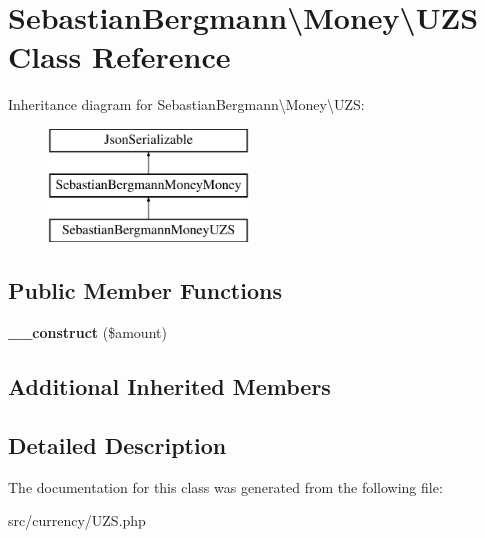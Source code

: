 \hypertarget{classSebastianBergmann_1_1Money_1_1UZS}{}\section{Sebastian\+Bergmann\textbackslash{}Money\textbackslash{}U\+Z\+S Class Reference}
\label{classSebastianBergmann_1_1Money_1_1UZS}
Inheritance diagram for Sebastian\+Bergmann\textbackslash{}Money\textbackslash{}U\+Z\+S\+:\begin{figure}[H]
\begin{center}
\leavevmode
\includegraphics[height=3.000000cm]{classSebastianBergmann_1_1Money_1_1UZS}
\end{center}
\end{figure}
\subsection*{Public Member Functions}
\begin{DoxyCompactItemize}
\item 
\hypertarget{classSebastianBergmann_1_1Money_1_1UZS_a0770a5dd3ac935b3f5255b2a36e49792}{}{\bfseries \+\_\+\+\_\+construct} (\$amount)\label{classSebastianBergmann_1_1Money_1_1UZS_a0770a5dd3ac935b3f5255b2a36e49792}

\end{DoxyCompactItemize}
\subsection*{Additional Inherited Members}


\subsection{Detailed Description}


The documentation for this class was generated from the following file\+:\begin{DoxyCompactItemize}
\item 
src/currency/U\+Z\+S.\+php\end{DoxyCompactItemize}
